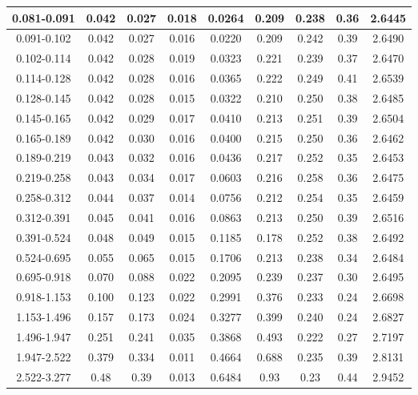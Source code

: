 \begin{table}
\begin{center}
\begin{tabular}{ | c | c | c | c | c | c | c | c | c| }
\hline
0.081-0.091 & 0.042 & 0.027 & 0.018 & 0.0264  & 0.209  &  0.238 & 0.36  & 2.6445 \\
\hline
0.091-0.102 & 0.042 & 0.027 & 0.016 & 0.0220  & 0.209  &  0.242 & 0.39  & 2.6490 \\
\hline
0.102-0.114 & 0.042 & 0.028 & 0.019 & 0.0323  & 0.221  &  0.239 & 0.37  & 2.6470 \\
\hline
0.114-0.128 & 0.042 & 0.028 & 0.016 & 0.0365  & 0.222  &  0.249 & 0.41  & 2.6539 \\
\hline
0.128-0.145 & 0.042 & 0.028 & 0.015 & 0.0322  & 0.210  &  0.250 & 0.38  & 2.6485 \\
\hline
0.145-0.165 & 0.042 & 0.029 & 0.017 & 0.0410  & 0.213  &  0.251 & 0.39  & 2.6504 \\
\hline
0.165-0.189 & 0.042 & 0.030 & 0.016 & 0.0400  & 0.215  &  0.250 & 0.36  & 2.6462 \\
\hline
0.189-0.219 & 0.043 & 0.032 & 0.016 & 0.0436  & 0.217  &  0.252 & 0.35  & 2.6453 \\
\hline
0.219-0.258 & 0.043 & 0.034 & 0.017 & 0.0603  & 0.216  &  0.258 & 0.36  & 2.6475 \\
\hline
0.258-0.312 & 0.044 & 0.037 & 0.014 & 0.0756  & 0.212  &  0.254 & 0.35  & 2.6459 \\
\hline
0.312-0.391 & 0.045 & 0.041 & 0.016 & 0.0863  & 0.213  &  0.250 & 0.39  & 2.6516\\
\hline
0.391-0.524 & 0.048 & 0.049 & 0.015 & 0.1185  & 0.178  &  0.252 & 0.38  & 2.6492 \\
\hline
0.524-0.695 & 0.055 & 0.065 & 0.015 & 0.1706  & 0.213  &  0.238 & 0.34  & 2.6484 \\
\hline
0.695-0.918 & 0.070 & 0.088 & 0.022 & 0.2095  & 0.239  &  0.237 & 0.30  & 2.6495 \\
\hline
0.918-1.153 & 0.100 & 0.123 & 0.022 & 0.2991  & 0.376  &  0.233 & 0.24  & 2.6698 \\
\hline
1.153-1.496 & 0.157 & 0.173 & 0.024 & 0.3277  & 0.399  &  0.240 & 0.24  & 2.6827 \\
\hline
1.496-1.947 & 0.251 & 0.241 & 0.035 & 0.3868  & 0.493  &  0.222 & 0.27  & 2.7197\\
\hline
1.947-2.522 & 0.379 & 0.334 & 0.011 & 0.4664  & 0.688  &  0.235 & 0.39  & 2.8131 \\
\hline
2.522-3.277 & 0.48  & 0.39  & 0.013 & 0.6484  & 0.93   &  0.23  & 0.44  & 2.9452 \\
\hline
\hline
\end{tabular}
\end{center}
\end{table}

